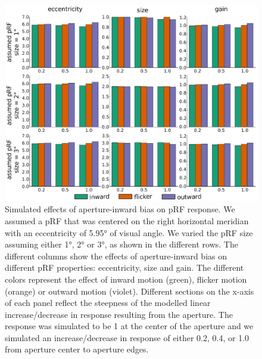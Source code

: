 \begin{figure}[htbp!]
\centering
\includegraphics[width=\textwidth]{figures/chapter_04/fig5b.eps}
\caption{Simulated effects of aperture-inward bias on pRF response. We assumed a pRF that was centered on the right horizontal meridian with an eccentricity of 5.95° of visual angle. We varied the pRF size assuming either 1°, 2° or 3°, as shown in the different rows. The different columns show the effects of aperture-inward bias on different pRF properties: eccentricity, size and gain. The different colors represent the effect of inward motion (green), flicker motion (orange) or outward motion (violet). Different sections on the x-axis of each panel reflect the steepness of the modelled linear increase/decrease in response resulting from the aperture. The response was simulated to be 1 at the center of the aperture and we simulated an increase/decrease in response of either 0.2, 0.4, or 1.0 from aperture center to aperture edges.}
\label{fig:trlEdge_res}
\end{figure}

\clearpage
\printbibliography[heading=subbibnumbered, title={References}]